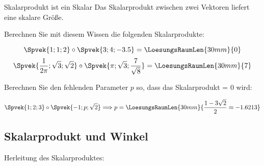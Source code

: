 \begin{gesetz}{Skalarprodukt ist ein Skalar}{}
  Das Skalarprodukt zwischen zwei Vektoren liefert eine skalare Größe.
\end{gesetz}

Berechnen Sie mit diesem Wissen die folgenden Skalarprodukte:

\vspace{3mm}


$$\Spvek{1;1;2} \circ \Spvek{3;4;-3.5} = \LoesungsRaumLen{30mm}{0}$$
$$\Spvek{\frac1{2\pi};\sqrt{3};\sqrt{2}} \circ \Spvek{\pi;
  \sqrt{3};\frac{7}{\sqrt{8}}} = \LoesungsRaumLen{30mm}{7}$$

Berechnen Sie den fehlenden Parameter $p$ so, dass das Skalarprodukt = 0 wird:
\vspace{3mm}

$$\Spvek{1;2;3}\circ{}\Spvek{-1;p;\sqrt{2}} \Longrightarrow p =
\LoesungsRaumLen{30mm}{\frac{1-3\sqrt{2}}{2} \approx -1.6213}$$


\newpage


\subsection{Skalarprodukt und Winkel}

Herleitung des Skalarproduktes:



